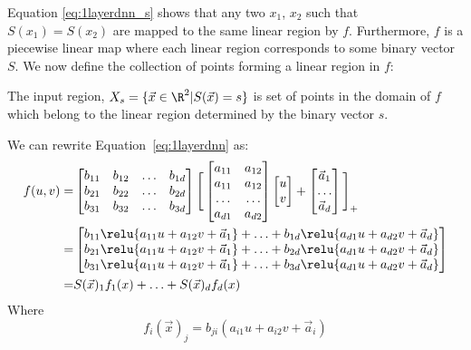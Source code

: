 Equation \ref{eq:1layerdnn_s} shows that any two $x_1$, $x_2$ such that $S(x_1) = S(x_2)$ are mapped to the same linear region by $f$. Furthermore, $f$ is a piecewise linear map where each linear region corresponds to some binary vector $S$. We now define the collection of points forming a linear region in $f$:

\begin{definition}\label{def:pl_region}
The input region, $X_s = \{ \vec{x} \in \R^2 | S(\vec{x}) = s\}$ is set of points in the domain of $f$ which belong to the linear region determined by the binary vector $s$.
\end{definition}

We can rewrite Equation~\ref{eq:1layerdnn} as:
\begin{align}
    f(u, v) =& 
    \begin{bmatrix}
        b_{11} & b_{12} & \ldots & b_{1d} \\
        b_{21} & b_{22} & \ldots & b_{2d} \\
        b_{31} & b_{32} & \ldots & b_{3d} 
    \end{bmatrix} \Bigg[\begin{bmatrix}
    a_{11} & a_{12} \\
    a_{11} & a_{12} \\
    \ldots & \ldots \\
    a_{d1} & a_{d2} \\
    \end{bmatrix} \begin{bmatrix} u \\ v \end{bmatrix} + \begin{bmatrix}\vec{a}_1 \\ \ldots \\ \vec{a}_d \end{bmatrix}\Bigg]_+ \nonumber
    \\
    =& \begin{bmatrix}
    b_{11} \relu{a_{11} u + a_{12} v + \vec{a}_1} + \ldots + b_{1d} \relu{a_{d1} u + a_{d2} v + \vec{a}_d} \\
    b_{21} \relu{a_{11} u + a_{12} v + \vec{a}_1} + \ldots + b_{2d} \relu{a_{d1} u + a_{d2} v + \vec{a}_d} \\
    b_{31} \relu{a_{11} u + a_{12} v + \vec{a}_1} + \ldots + b_{3d} \relu{a_{d1} u + a_{d2} v + \vec{a}_d} \\
    \end{bmatrix} \nonumber
    \\
    =& S(\vec{x})_1 f_1(x) + \ldots + S(\vec{x})_d f_d(x) \label{eq:1layerdnn_factored}
\end{align}
Where 
\begin{equation}\label{eq:fk_j}
    f_i(\vec{x})_j = b_{ji} (a_{i1} u + a_{i2} v + \vec{a}_i)
\end{equation}


